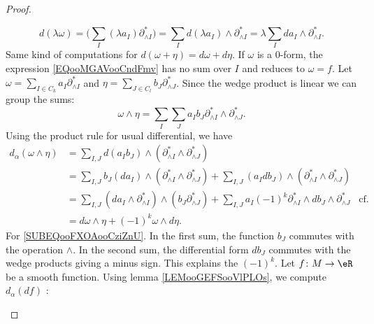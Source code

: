 \begin{proof}
\begin{subproof}
\begin{equation}
			d(\lambda \omega)  =\big( \sum_I(\lambda a_I)\partial^*_{\wedge I} \big)
			=\sum_Id(\lambda a_I)\wedge\partial^*_{\wedge I}
			=\lambda\sum_Ida_I\wedge \partial^*_{\wedge I}.
		\end{equation}
		Same kind of computations for \( d(\omega+\eta)=d\omega+d\eta\).
		If \( \omega\) is a \( 0\)-form, the expression \eqref{EQooMGAVooCndFmv} has no sum over \( I\) and reduces to \( \omega=f\).
		Let \( \omega=\sum_{I\in C_k}a_I\partial^*_{\wedge I}\) and \( \eta=\sum_{J\in C_l}b_J\partial^*_{\wedge J}\). Since the wedge product is linear we can group the sums:
		\begin{equation}
			\omega\wedge \eta=\sum_I\sum_Ja_Ib_J\partial^*_{\wedge I}\wedge \partial^*_{\wedge J}.
		\end{equation}
		Using the product rule for usual differential, we have
		\begin{subequations}
			\begin{align}
				d_{\alpha}(\omega\wedge\eta) & =\sum_{I,J}d(a_Ib_J)\wedge(\partial^*_{\wedge I}\wedge \partial^*_{\wedge J})                                                                                                                               \\
				                             & =\sum_{I,J}b_J(da_I)\wedge(\partial^*_{\wedge I}\wedge \partial^*_{\wedge J})+\sum_{I,J}(a_Idb_J)\wedge(\partial^*_{\wedge I}\wedge \partial^*_{\wedge J})                                                  \\
				                             & =\sum_{I,J}(da_I\wedge \partial^*_{\wedge I})\wedge(b_J\partial^*_{\wedge J})+\sum_{I,J}a_I(-1)^k\partial^*_{\wedge I}\wedge db_J\wedge\partial^*_{\wedge J} & \text{cf. bellow}		\label{SUBEQooFXOAooCziZnU} \\
				                             & = d\omega\wedge\eta+(-1)^k\omega\wedge d\eta.
			\end{align}
		\end{subequations}
		For \eqref{SUBEQooFXOAooCziZnU}. In the first sum, the function \( b_J\) commutes with the operation \( \wedge\). In the second sum, the differential form \( db_J\) commutes with the wedge products giving a minus sign. This explains the \( (-1)^k\).
		\spitem[\( d(df)=0\)]
		Let \(f \colon M\to \eR  \) be a smooth function. Using lemma \ref{LEMooGEFSooVlPLOs}, we compute \( d_{\alpha}(df)\) :

\end{subproof}
\end{proof}
